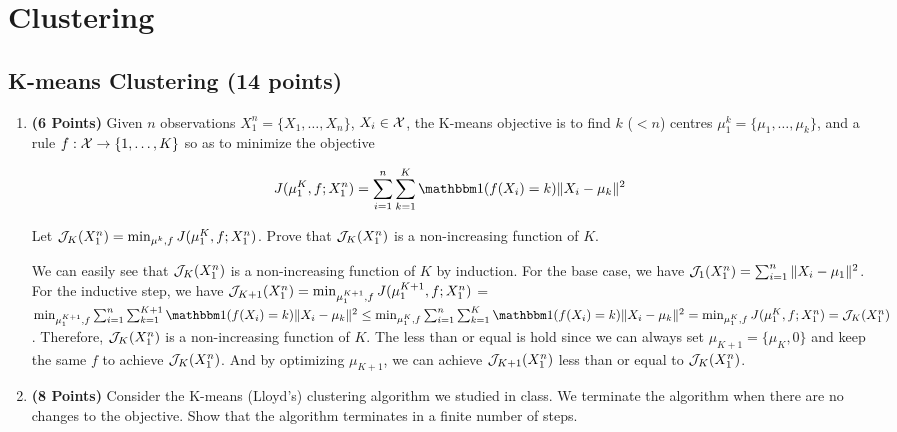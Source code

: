 \section{Clustering}

\subsection{K-means Clustering (14 points)}

\begin{enumerate}

\item \textbf{(6 Points)}
Given $n$ observations $X_1^n = \{X_1, \dots, X_n\}$, $X_i \in \mathcal{X}$, the K-means objective
is to find $k$
($<n$) centres $\mu_1^k = \{\mu_1, \dots, \mu_k\}$, and a rule $f:\mathcal{X} \rightarrow
\{1,\dots, K\}$ so as to minimize the objective

\begin{equation}
J(\mu_1^K, f; X_1^n) = \sum_{i=1}^n \sum_{k=1}^K \indfone(f(X_i) = k) \|X_i - \mu_k\|^2
\label{eqn:kmeans}
\end{equation}

Let $\mathcal{J}_K(X_1^n) = \min_{\mu^k, f} J(\mu_1^K, f; X_1^n)$. Prove that
$\mathcal{J}_{K}(X_1^n)$ is a non-increasing function of $K$.

\begin{soln}

    We can easily see that $\mathcal{J}_{K}(X_1^n)$ is a non-increasing function of $K$ by
    induction. For the base case, we have $\mathcal{J}_{1}(X_1^n) = \sum_{i=1}^n \|X_i -
    \mu_1\|^2 $. For the inductive step, we have $\mathcal{J}_{K+1}(X_1^n) = \min_{\mu_1^{K
    +1}, f} J(\mu_1^{K+1}, f; X_1^n)$ = $\min_{\mu_1^{K+1}, f} \sum_{i=1}^n \sum_{k=1}^
    {K+1} \indfone(f(X_i) = k) \|X_i - \mu_k\|^2 \leq \min_{\mu_1^{K}, f} \sum_{i=1}^n
    \sum_{k=1}^{K} \indfone(f(X_i) = k) \|X_i - \mu_k\|^2 = \min_{\mu_1^{K}, f} J(\mu_1^
    {K}, f; X_1^n) = \Jcal_{K}(X_1^n)$. Therefore, $\mathcal{J}_{K}(X_1^n)$ is a
    non-increasing function of $K$.
    The less than or equal is hold since we can always set $\mu_{K+1} = \{\mu_{K},0\}$
    and keep the same $f$ to achieve $\mathcal{J}_{K}(X_1^n)$. And by optimizing $\mu_{K+1}
    $, we can achieve $\mathcal{J}_{K+1}(X_1^n)$ less than or equal to $\mathcal{J}_{K}(X_1^n)$. 

\end{soln}

\item \textbf{(8 Points)}
Consider the K-means (Lloyd's) clustering algorithm we studied in class. We
terminate the algorithm when there are no changes to the objective.
Show that the algorithm terminates in a finite number of steps.


\end{enumerate}

